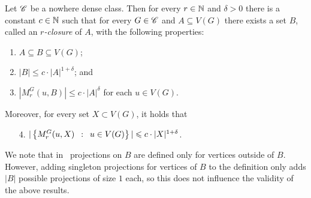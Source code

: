 
\begin{lemma}\label{lem:closure-nd}
Let $\mathscr{C}$ be a nowhere dense class. 
Then for every $r\in\mathbb{N}$ and $\delta>0$ there is a 
constant $c\in\mathbb{N}$ such that for every $G\in \mathscr{C}$ and $A\subseteq V(G)$ there exists a set 
$B$,  called an {\em{$r$-closure}} of $A$, 
with the following properties: 
\begin{enumerate}%
  \item $A\subseteq B\subseteq V(G)$;
  \item $|B|\leq c\cdot |A|^{1+\delta}$; and
  \item $|M_r^G(u,B)|\leq c\cdot |A|^{\delta}$ for each $u\in V(G)$.
  \end{enumerate}
  Moreover, for every set $X\subset V(G)$, it holds that
  \begin{enumerate}  
  \item[4.] $|\left\{M_r^G(u,X) \,~:~\, u\in V(G) \right\}|\leqslant c\cdot |X|^{1+\delta}$.
\end{enumerate}
\end{lemma}

We note that in~\cite{drange2016kernelization,eickmeyer2016neighborhood} projections on $B$ are defined only for vertices outside of $B$. 
However, adding singleton projections for vertices of $B$ to the definition only adds $|B|$ possible projections of size $1$ each, so this does not influence the validity of the above results.


